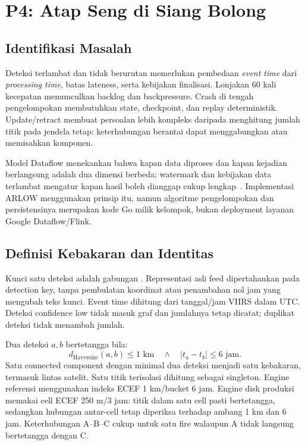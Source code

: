 \chapter{P4: Atap Seng di Siang Bolong}
\section{Identifikasi Masalah}
Deteksi terlambat dan tidak berurutan memerlukan pembedaan \emph{event time} dari \emph{processing time}, batas lateness, serta kebijakan finalisasi. Lonjakan 60 kali kecepatan memunculkan backlog dan backpressure. Crash di tengah pengelompokan membutuhkan state, checkpoint, dan replay deterministik. Update/retract membuat persoalan lebih kompleks daripada menghitung jumlah titik pada jendela tetap: keterhubungan berantai dapat menggabungkan atau memisahkan komponen.

Model Dataflow menekankan bahwa kapan data diproses dan kapan kejadian berlangsung adalah dua dimensi berbeda; watermark dan kebijakan data terlambat mengatur kapan hasil boleh dianggap cukup lengkap~\cite{dataflow}. Implementasi ARLOW menggunakan prinsip itu, namun algoritme pengelompokan dan persistensinya merupakan kode Go milik kelompok, bukan deployment layanan Google Dataflow/Flink.

\section{Definisi Kebakaran dan Identitas}
Kunci satu deteksi adalah gabungan . Representasi asli feed dipertahankan pada detection key, tanpa pembulatan koordinat atau penambahan nol jam yang mengubah teks kunci. Event time dihitung dari tanggal/jam VIIRS dalam UTC. Deteksi confidence low tidak masuk graf dan jumlahnya tetap dicatat; duplikat deteksi tidak menambah jumlah.

Dua deteksi $a,b$ bertetangga bila:
\[
 d_{\mathrm{Haversine}}(a,b)\leq 1\text{ km}
 \quad\land\quad |t_a-t_b|\leq 6\text{ jam}.
\]
Satu connected component dengan minimal dua deteksi menjadi satu kebakaran, termasuk lintas satelit. Satu titik terisolasi dihitung sebagai singleton. Engine referensi menggunakan indeks ECEF 1 km/bucket 6 jam. Engine disk produksi memakai cell ECEF 250 m/3 jam: titik dalam satu cell pasti bertetangga, sedangkan hubungan antar-cell tetap diperiksa terhadap ambang 1 km dan 6 jam. Keterhubungan A--B--C cukup untuk satu fire walaupun A tidak langsung bertetangga dengan C.

